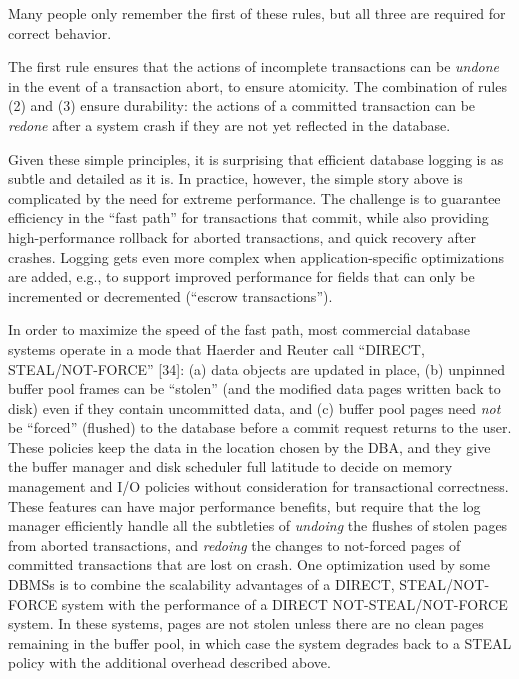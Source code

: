 \documentclass[b5paper,11pt,twoside,openright]{book}
\begin{document}
Many people only remember the first of these rules, but all three are
required for correct behavior.

The first rule ensures that the actions of incomplete transactions can
be \emph{undone} in the event of a transaction abort, to ensure
atomicity. The combination of rules (2) and (3) ensure durability: the
actions of a committed transaction can be \emph{redone} after a system
crash if they are not yet reflected in the database.

Given these simple principles, it is surprising that efficient database
logging is as subtle and detailed as it is. In practice, however, the
simple story above is complicated by the need for extreme performance.
The challenge is to guarantee efficiency in the ``fast path'' for
transactions that commit, while also providing high-performance rollback
for aborted transactions, and quick recovery after crashes. Logging gets
even more complex when application-specific optimizations are added,
e.g., to support improved performance for fields that can only be
incremented or decremented (``escrow transactions'').

In order to maximize the speed of the fast path, most commercial
database systems operate in a mode that Haerder and Reuter call
``DIRECT, STEAL/NOT-FORCE'' {[}34{]}: (a) data objects are updated in
place, (b) unpinned buffer pool frames can be ``stolen'' (and the
modified data pages written back to disk) even if they contain
uncommitted data, and (c) buffer pool pages need \emph{not} be
``forced'' (flushed) to the database before a commit request returns to
the user. These policies keep the data in the location chosen by the
DBA, and they give the buffer manager and disk scheduler full latitude
to decide on memory management and I/O policies without consideration
for transactional correctness. These features can have major performance
benefits, but require that the log manager efficiently handle all the
subtleties of \emph{undoing} the flushes of stolen pages from aborted
transactions, and \emph{redoing} the changes to not-forced pages of
committed transactions that are lost on crash. One optimization used by
some DBMSs is to combine the scalability advantages of a DIRECT,
STEAL/NOT-FORCE system with the performance of a DIRECT
NOT-STEAL/NOT-FORCE system. In these systems, pages are not stolen
unless there are no clean pages remaining in the buffer pool, in which
case the system degrades back to a STEAL policy with the additional
overhead described above.
\end{document}
